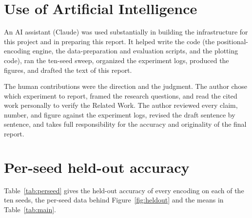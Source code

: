 \documentclass{article}
\begin{document}



\section*{Use of Artificial Intelligence}
An AI assistant (Claude) was used substantially in building the infrastructure for
this project and in preparing this report. It helped write the code (the
positional-encoding engine, the data-preparation and evaluation scripts, and the
plotting code), ran the ten-seed sweep, organized the experiment logs, produced the
figures, and drafted the text of this report.

The human contributions were the direction and the judgment. The author chose which
experiment to report, framed the research questions, and read the cited work
personally to verify the Related Work. The author reviewed every claim, number, and
figure against the experiment logs, revised the draft sentence by sentence, and takes
full responsibility for the accuracy and originality of the final report.

\appendix
\section{Per-seed held-out accuracy}
\label{app:perseed}
\renewcommand{\thetable}{A\arabic{table}}
\setcounter{table}{0}

Table~\ref{tab:perseed} gives the held-out accuracy of every encoding on each of
the ten seeds, the per-seed data behind Figure~\ref{fig:heldout} and the means in
Table~\ref{tab:main}.
\end{document}
